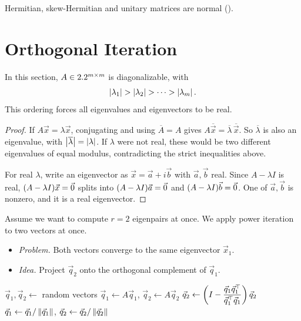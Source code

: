 Hermitian, skew-Hermitian and unitary matrices are normal ().

\section{Orthogonal Iteration}
\label{sec:orth-iter}

In this section, $A \in 2.2^{m \times m}$ is diagonalizable, with
\begin{equation}
  \left\lvert \lambda_1 \right\rvert > \left\lvert \lambda_2 \right\rvert > \dots > \left\lvert \lambda_m \right\rvert.
\end{equation}
This ordering forces all eigenvalues and eigenvectors to be real.

\begin{proof}
  If $A\vec{x} = \lambda\vec{x}$, conjugating and using $\overline{A} = A$ gives $A\overline{\vec{x}} = \overline{\lambda}\,\overline{\vec{x}}$. So $\overline{\lambda}$ is also an eigenvalue, with $\left\lvert \overline{\lambda} \right\rvert = \left\lvert \lambda \right\rvert$. If $\lambda$ were not real, these would be two different eigenvalues of equal modulus, contradicting the strict inequalities above.

  For real $\lambda$, write an eigenvector as $\vec{x} = \vec{a} + i\vec{b}$ with $\vec{a}, \vec{b}$ real. Since $A - \lambda I$ is real, $(A - \lambda I)\vec{x} = \vec{0}$ splits into $(A - \lambda I)\vec{a} = \vec{0}$ and $(A - \lambda I)\vec{b} = \vec{0}$. One of $\vec{a}, \vec{b}$ is nonzero, and it is a real eigenvector.
\end{proof}

Assume we want to compute $r = 2$ eigenpairs at once. We apply power iteration to two vectors at once.
\begin{itemize}
  \item \emph{Problem.} Both vectors converge to the same eigenvector $\vec{x}_1$.
  \item \emph{Idea.} Project $\vec{q}_2$ onto the orthogonal complement of $\vec{q}_1$.
\end{itemize}

\begin{algorithm}[H]
  \caption{Orthogonal iteration with two vectors.}
  \label{alg:orth-iter-2}
  \begin{algorithmic}[1]
    \State $\vec{q}_1, \vec{q}_2 \gets$ random vectors
      \State $\vec{q}_1 \gets A\vec{q}_1$, \quad $\vec{q}_2 \gets A\vec{q}_2$
      \State $\vec{q}_2 \gets \left(I - \dfrac{\vec{q}_1\vec{q}_1^\top}{\vec{q}_1^\top\vec{q}_1}\right)\vec{q}_2$ 
      \State $\vec{q}_1 \gets \vec{q}_1/\left\lVert \vec{q}_1 \right\rVert$, \quad $\vec{q}_2 \gets \vec{q}_2/\left\lVert \vec{q}_2 \right\rVert$
    \EndWhile
  \end{algorithmic}
\end{algorithm}

